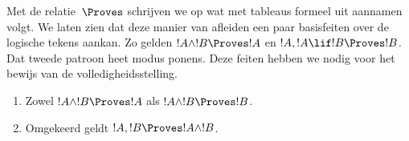 \documentclass[openany]{memoir}
\begin{document}
\begingroup
\def\olfilename{OLP-0107}
\def\olfilepath{content/first-order-logic/tableaux/}
\hypertarget{unit-OLP-0107}{}




      {}
      {}


\begin{explain}
  Met de relatie~$\Proves$ schrijven we op wat met tableaus formeel
  uit aannamen volgt. We laten zien dat deze manier van afleiden een
  paar basisfeiten over de logische tekens aankan. Zo gelden
  $!A \land !B \Proves !A$ en $!A, !A \lif !B \Proves !B$. Dat tweede
  patroon heet modus ponens. Deze feiten hebben we nodig voor het
  bewijs van de volledigheidsstelling.
\end{explain}

\begin{prop}
  \begin{enumerate}
  \item {} Zowel $!A \land !B \Proves
    !A$ als $!A \land !B \Proves !B$.
  \item {} Omgekeerd geldt
    $!A, !B \Proves !A \land !B$.
  \end{enumerate}
\end{prop}
\end{document}
